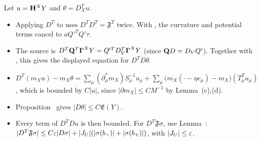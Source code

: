 \begin{detail}\label{d8:ix8}
Let $u=\mathbf H^XY$ and $\theta=D^T_Xu$.
\begin{itemize}
\item Applying $D^T$ to  uses $D^TD^T=\mathfrak F^T$ twice. With , the curvature and potential terms cancel to $aQ'^TQ'\tau$.
\item The source is $D^T\mathbf Q^T\boldsymbol\Gamma^XY=Q'^TD_V^T\boldsymbol\Gamma^XY$ (since $\mathbf Q D=D_VQ'$). Together with , this gives the displayed equation for $D^TD\theta$.
\item $D^T(m_Xu)-m_X\theta=\sum_\mu(\partial^*_\mu m_X)S_\mu^{-1}u_\mu+\sum_\mu\big(m_X(\cdot-\eta e_\mu)-m_X\big)(T^T_\mu u_\mu)$, which is bounded by $C|u|$, since $|\partial m_X|\le CM^{-1}$ by Lemma~(c),(d).
\item Proposition~ gives $|D\theta|\le C\mathfrak E(Y)$.
\item Every term of $D^TDu$ is then bounded. For $D^T\mathfrak F\sigma$, use Lemma~: $|D^T\mathfrak F\sigma|\le C\varepsilon|D\sigma|+|J_U|(|\sigma(b_-)|+|\sigma(b_+)|)$, with $|J_U|\le\varepsilon$.
\end{itemize}
\end{detail}

